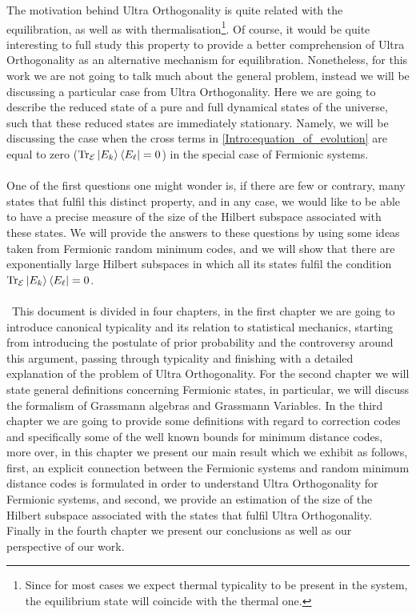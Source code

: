 \indent The motivation behind Ultra Orthogonality is quite related with the equilibration, as well as with thermalisation\footnote{ Since for most cases we expect thermal typicality to be present in the system, the equilibrium state will coincide with the thermal one.}. Of course, it would be quite interesting to full study this property to provide a better comprehension of Ultra Orthogonality as an alternative mechanism for equilibration. Nonetheless, for this work we are not going to talk much about the general problem, instead we will be discussing a particular case from Ultra Orthogonality. Here we are going to describe the reduced state of a pure and full dynamical states of the universe, such that these reduced states are immediately stationary. Namely, we will be discussing the case when the cross terms in \eqref{Intro:equation_of_evolution} are equal to zero ($\operatorname{Tr}_{\mathcal{E}}\mathinner{|{E_k}\rangle}\mathinner{\langle{E_\ell}|} = 0$) in the special case of Fermionic systems.\\\\
\indent One of the first questions one might wonder is, if there are few or contrary, many states that fulfil this distinct property, and in any case, we would like to be able to have a precise measure of the size of the Hilbert subspace associated with these states. We will provide the answers to these questions by using some ideas taken from Fermionic random minimum codes, and we will show that there are exponentially large Hilbert subspaces in which all its states fulfil the condition $\operatorname{Tr}_{\mathcal{E}}\mathinner{|{E_k}\rangle}\mathinner{\langle{E_\ell}|} = 0$.\\\\\
\indent This document is divided in four chapters, in the first chapter we are going to introduce canonical typicality and its relation to statistical mechanics, starting from introducing the postulate of prior probability and the controversy around this argument, passing through typicality and finishing with a detailed explanation of the problem of Ultra Orthogonality. For the second chapter we will state general definitions concerning Fermionic states, in particular, we will discuss the formalism of Grassmann algebras and Grassmann Variables. In the third chapter we are going to provide some definitions with regard to correction codes and specifically some of the well known bounds for minimum distance codes, more over, in this chapter we present our main result which we exhibit as follows, first, an explicit connection between the Fermionic systems and random minimum distance codes is formulated in order to understand Ultra Orthogonality for Fermionic systems, and second, we provide an estimation of the size of the Hilbert subspace associated with the states that fulfil Ultra Orthogonality. Finally in the fourth chapter we present our conclusions as well as our perspective of our work.



